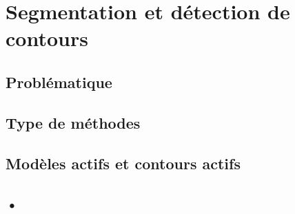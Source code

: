 \section{Segmentation et détection de contours}

\subsection{Problématique}
\subsection{Type de méthodes}
\subsection{Modèles actifs et contours actifs}
\subsection{•}